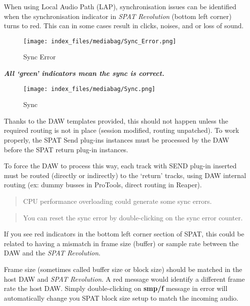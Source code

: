 \documentclass[
  letterpaper,
  DIV=11,
  numbers=noendperiod]{scrreport}
\begin{document}
When using Local Audio Path (LAP), synchronisation issues can be
identified when the synchronisation indicator in \emph{SPAT Revolution}
(bottom left corner) turns to red. This can in some cases result in
clicks, noises, and or loss of sound.

\begin{figure}

{\centering \texttt{[image: index\_files/mediabag/Sync\_Error.png]}

}

\caption{Sync Error}

\end{figure}

\textbf{\emph{All `green' indicators mean the sync is correct.}}

\begin{figure}

{\centering \texttt{[image: index\_files/mediabag/Sync.png]}

}

\caption{Sync}

\end{figure}

Thanks to the DAW templates provided, this should not happen unless the
required routing is not in place (session modified, routing unpatched).
To work properly, the SPAT Send plug-ins instances must be processed by
the DAW before the SPAT return plug-in instances.

To force the DAW to process this way, each track with SEND plug-in
inserted must be routed (directly or indirectly) to the `return' tracks,
using DAW internal routing (ex: dummy busses in ProTools, direct routing
in Reaper).

\begin{quote}
CPU performance overloading could generate some sync errors.
\end{quote}

\begin{quote}
You can reset the sync error by double-clicking on the sync error
counter.
\end{quote}

If you see red indicators in the bottom left corner section of SPAT,
this could be related to having a mismatch in frame size (buffer) or
sample rate between the DAW and the \emph{SPAT Revolution}.

Frame size (sometimes called buffer size or block size) should be
matched in the host DAW and \emph{SPAT Revolution}. A red message would
identify a different frame rate the host DAW. Simply double-clicking on
\textbf{smp/f} message in error will automatically change you SPAT block
size setup to match the incoming audio.
\end{document}
